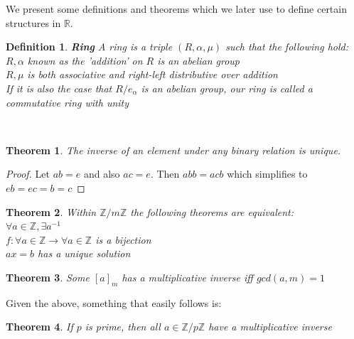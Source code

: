 \documentclass[titlepage]{article}
\newtheorem{theorem}{Theorem}[section]
\newtheorem{definition}{Definition}
\begin{document}
We present some definitions and theorems which we later use to define certain structures in $\mathbb{R}$.

\begin{definition}\textbf{Ring}
A ring is a triple $(R,\alpha,\mu)$ such that the following hold:
\\

$R,\alpha$ known as the 'addition' on $R$ is an abelian group 
\\

$R, \mu$ is both associative and right-left distributive over addition
\\

If it is also the case that $R/{e_{\alpha}}$ is an abelian group, our ring is called a \textit{commutative ring with unity}

\end{definition}
\\

\begin{theorem}
The inverse of an element under any binary relation is unique.
\end{theorem}

\begin{proof}
Let $ab = e$ and also $ac=e$. Then $abb=acb$ which simplifies to $eb=ec=b=c$
\end{proof}

\begin{theorem}
Within $\mathbb{Z} / m\mathbb{Z}$ the following theorems are equivalent:
\\

$\forall a \in \mathbb{Z}, \exists a^{-1}$
\\

$f:\forall a \in \mathbb{Z} \to \forall a \in \mathbb{Z}$ is a bijection
\\

$ax=b$ has a unique solution 

\end{theorem}

\begin{theorem}
Some $[a]_{m}$ has a multiplicative inverse iff $gcd(a,m)=1$
\end{theorem}


Given the above, something that easily follows is:

\begin{theorem}
If $p$ is prime, then all $a \in \mathbb{Z}/p\mathbb{Z}$ have a multiplicative inverse 
\end{theorem}
\end{document}
